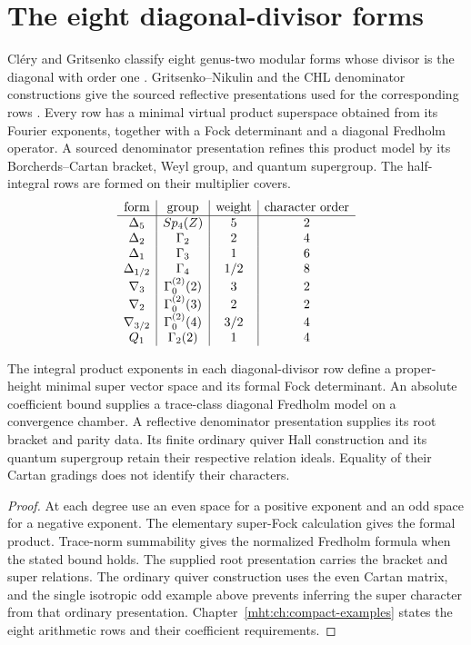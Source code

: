 \chapter{The eight diagonal-divisor forms}
Cl\'ery and Gritsenko classify eight genus-two modular forms whose divisor is the diagonal with order one \cite{GC}.  Gritsenko--Nikulin and the CHL denominator constructions give the sourced reflective presentations used for the corresponding rows \cite{GN97,GN98a,GN98b,GovindarajanKrishna2009,Govindarajan2011,GovindarajanSamanta2019}.  Every row has a minimal virtual product superspace obtained from its Fourier exponents, together with a Fock determinant and a diagonal Fredholm operator.  A sourced denominator presentation refines this product model by its Borcherds--Cartan bracket, Weyl group, and quantum supergroup.  The half-integral rows are formed on their multiplier covers.
\[
\begin{array}{c|c|c|c}
\text{form}&\text{group}&\text{weight}&\text{character order}\\ \hline
\Delta_5&Sp_4(Z)&5&2\\
\Delta_2&\Gamma_2&2&4\\
\Delta_1&\Gamma_3&1&6\\
\Delta_{1/2}&\Gamma_4&1/2&8\\
\nabla_3&\Gamma^{(2)}_0(2)&3&2\\
\nabla_2&\Gamma^{(2)}_0(3)&2&2\\
\nabla_{3/2}&\Gamma^{(2)}_0(4)&3/2&4\\
Q_1&\Gamma_2(2)&1&4
\end{array}
\]

\begin{theorem}
The integral product exponents in each diagonal-divisor row define a proper-height minimal super vector space and its formal Fock determinant.
An absolute coefficient bound supplies a trace-class diagonal Fredholm model on a convergence chamber.
A reflective denominator presentation supplies its root bracket and parity data.
Its finite ordinary quiver Hall construction and its quantum supergroup retain their respective relation ideals. Equality of their Cartan gradings does not identify their characters.
\end{theorem}
\begin{proof}
At each degree use an even space for a positive exponent and an odd space for a negative exponent.
The elementary super-Fock calculation gives the formal product.
Trace-norm summability gives the normalized Fredholm formula when the stated bound holds.
The supplied root presentation carries the bracket and super relations.
The ordinary quiver construction uses the even Cartan matrix, and the single isotropic odd example above prevents inferring the super character from that ordinary presentation.
Chapter~\ref{mht:ch:compact-examples} states the eight arithmetic rows and their coefficient requirements.
\end{proof}

